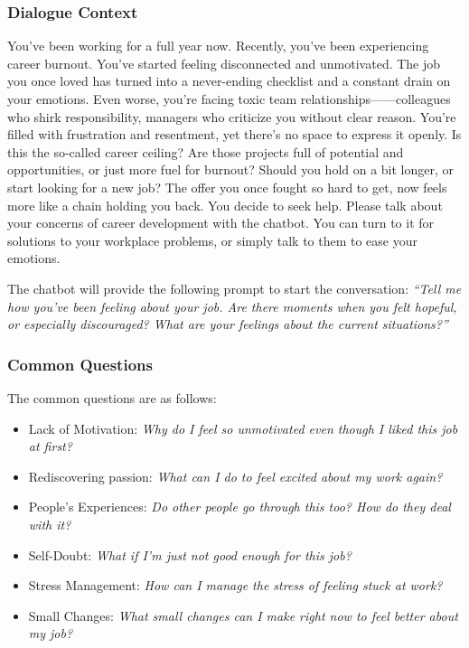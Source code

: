 \subsubsection{Dialogue Context}
You've been working for a full year now. Recently, you've been experiencing career burnout. You've started feeling disconnected and unmotivated. The job you once loved has turned into a never-ending checklist and a constant drain on your emotions. Even worse, you're facing toxic team relationships——colleagues who shirk responsibility, managers who criticize you without clear reason. You're filled with frustration and resentment, yet there’s no space to express it openly. 
Is this the so-called career ceiling? Are those projects full of potential and opportunities, or just more fuel for burnout? Should you hold on a bit longer, or start looking for a new job? The offer you once fought so hard to get, now feels more like a chain holding you back. You decide to seek help.
Please talk about your concerns of career development with the chatbot. You can turn to it for solutions to your workplace problems, or simply talk to them to ease your emotions.

The chatbot will provide the following prompt to start the conversation:
\textit{``Tell me how you've been feeling about your job. Are there moments when you felt hopeful, or especially discouraged? What are your feelings about the current situations?''}

\subsubsection{Common Questions}
The common questions are as follows:
\begin{itemize}
    \item Lack of Motivation: \textit{Why do I feel so unmotivated even though I liked this job at first?}
    \item  Rediscovering passion: \textit{What can I do to feel excited about my work again?}
    \item  People's Experiences: \textit{Do other people go through this too? How do they deal with it?}
    \item Self-Doubt: \textit{What if I’m just not good enough for this job?}
    \item Stress Management: \textit{How can I manage the stress of feeling stuck at work?}
    \item Small Changes: \textit{What small changes can I make right now to feel better about my job?}
\end{itemize}

